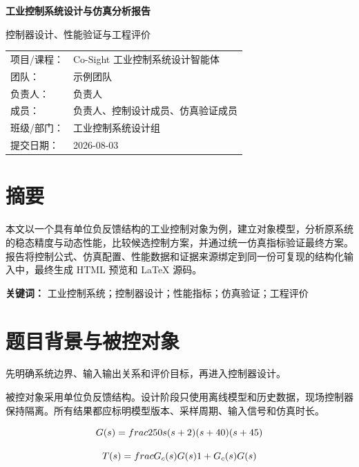 \documentclass[UTF8,a4paper,12pt]{ctexart}
\begin{document}
\begin{titlepage}
  \thispagestyle{empty}
  \centering
  \vspace*{2.4cm}
  {\bfseries 工业控制系统设计与仿真分析报告\par}
  \vspace{1.2cm}
  { 控制器设计、性能验证与工程评价\par}
  \vfill
  \begin{tabular}{p{3.1cm}p{8.5cm}}
    项目/课程：& Co-Sight 工业控制系统设计智能体\\[0.65em]
    团队：& 示例团队\\[0.65em]
    负责人：& 负责人\\[0.65em]
    成员：& 负责人、控制设计成员、仿真验证成员\\[0.65em]
    班级/部门：& 工业控制系统设计组\\[0.65em]
    提交日期：& 2026-08-03\\[0.65em]
  \end{tabular}
  \vspace*{1cm}
\end{titlepage}
\clearpage
{}
\pagestyle{plain}
\tableofcontents
\clearpage
{}
\pagestyle{fancy}
\section*{摘要}
本文以一个具有单位负反馈结构的工业控制对象为例，建立对象模型，分析原系统的稳态精度与动态性能，比较候选控制方案，并通过统一仿真指标验证最终方案。报告将控制公式、仿真配置、性能数据和证据来源绑定到同一份可复现的结构化输入中，最终生成 HTML 预览和 LaTeX 源码。
\par
\noindent\textbf{关键词：} 工业控制系统；控制器设计；性能指标；仿真验证；工程评价
\clearpage
\section{题目背景与被控对象}\label{sec:model}
先明确系统边界、输入输出关系和评价目标，再进入控制器设计。
\par
被控对象采用单位负反馈结构。设计阶段只使用离线模型和历史数据，现场控制器保持隔离。所有结果都应标明模型版本、采样周期、输入信号和仿真时长。


\begin{equation}
G(s)=\\frac{250}{s(s+2)(s+40)(s+45)}
\label{eq:plant}
\end{equation}

\begin{equation}
T(s)=\\frac{G_c(s)G(s)}{1+G_c(s)G(s)}
\label{eq:closed_loop}
\end{equation}
\end{document}
